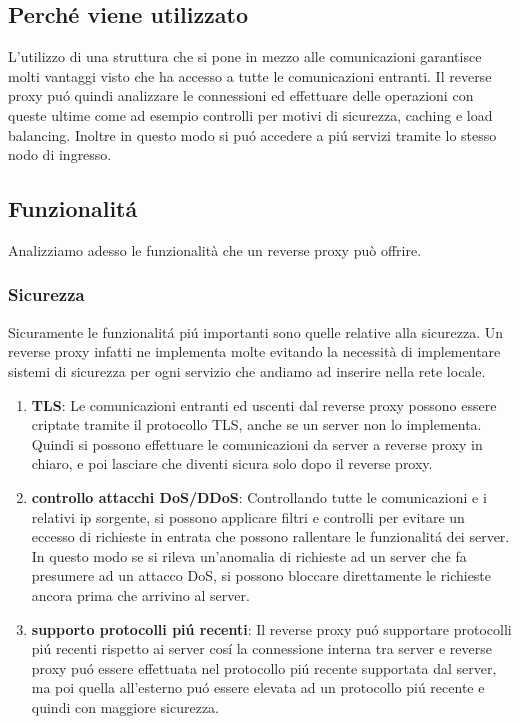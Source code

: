 \subsection{Perché viene utilizzato}
L'utilizzo di una struttura che si pone in mezzo alle comunicazioni garantisce molti vantaggi visto che ha accesso a tutte le comunicazioni entranti. Il reverse proxy puó quindi analizzare le connessioni ed effettuare delle operazioni con queste ultime come ad esempio controlli per motivi di sicurezza, caching e load balancing. Inoltre in questo modo si puó accedere a piú servizi tramite lo stesso nodo di ingresso.

\subsection{Funzionalitá}
Analizziamo adesso le funzionalità che un reverse proxy può offrire.

\subsubsection{Sicurezza}
Sicuramente le funzionalitá piú importanti sono quelle relative alla sicurezza. Un reverse proxy infatti ne implementa molte evitando la necessità di implementare sistemi di sicurezza per ogni servizio che andiamo ad inserire nella rete locale.
\begin{enumerate}
  \item \textbf{TLS}: Le comunicazioni entranti ed uscenti dal reverse proxy possono essere criptate tramite il protocollo TLS, anche se un server non lo implementa. Quindi si possono effettuare le comunicazioni da server a reverse proxy in chiaro, e poi lasciare che diventi sicura solo dopo il reverse proxy.
  \item \textbf{controllo attacchi DoS/DDoS}: Controllando tutte le comunicazioni e i relativi ip sorgente, si possono applicare filtri e controlli per evitare un eccesso di richieste in entrata che possono rallentare le funzionalitá dei server. In questo modo se si rileva un'anomalia di richieste ad un server che fa presumere ad un attacco DoS, si possono bloccare direttamente le richieste ancora prima che arrivino al server.
  \item \textbf{supporto protocolli piú recenti}: Il reverse proxy puó supportare protocolli piú recenti rispetto ai server cosí la connessione interna tra server e reverse proxy puó essere effettuata nel protocollo piú recente supportata dal server, ma poi quella all'esterno puó essere elevata ad un protocollo piú recente e quindi con maggiore sicurezza.

\end{enumerate}

